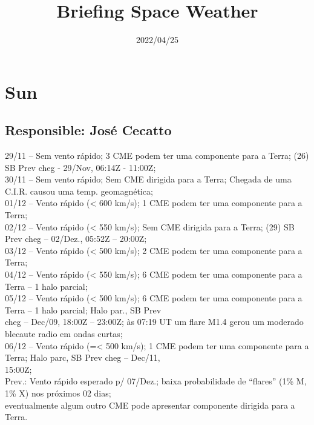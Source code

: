 \documentclass[11pt, oneside]{article}
\title{Briefing Space Weather}
\date{2022/04/25}
\begin{document}
\maketitle 

 \section{Sun} 
 \subsection{Responsible: José Cecatto}

29/11 – Sem vento rápido; 3 CME podem ter uma componente para a Terra; (26) SB Prev cheg - 29/Nov, 06:14Z - 11:00Z; \\ 30/11 – Sem vento rápido; Sem CME dirigida para a Terra; Chegada de uma C.I.R. causou uma temp. geomagnética; \\ 01/12 – Vento rápido (< 600 km/s); 1 CME podem ter uma componente para a Terra; \\ 02/12 – Vento rápido (< 550 km/s); Sem CME dirigida para a Terra; (29) SB Prev cheg – 02/Dez., 05:52Z – 20:00Z; \\ 03/12 – Vento rápido (< 500 km/s); 2 CME podem ter uma componente para a Terra; \\ 04/12 – Vento rápido (< 550 km/s); 6 CME podem ter uma componente para a Terra – 1 halo parcial; \\ 05/12 – Vento rápido (< 500 km/s); 6 CME podem ter uma componente para a Terra – 1 halo parcial; Halo par., SB Prev \\ cheg – Dec/09, 18:00Z – 23:00Z; às 07:19 UT um flare M1.4 gerou um moderado blecaute radio em ondas curtas; \\ 06/12 – Vento rápido (=< 500 km/s); 1 CME podem ter uma componente para a Terra; Halo parc, SB Prev cheg – Dec/11, \\ 15:00Z; \\ Prev.: Vento rápido esperado p/ 07/Dez.; baixa probabilidade de “flares” (1\% M, 1\% X) nos próximos 02 dias; \\ eventualmente algum outro CME pode apresentar componente dirigida para a Terra.
\end{document}
